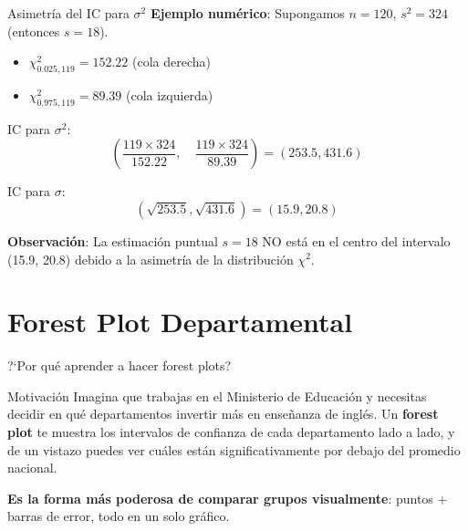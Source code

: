 \documentclass[aspectratio=169, 11pt]{beamer}
\begin{document}
\begin{frame}{Asimetría del IC para $\sigma^2$}
\textbf{Ejemplo numérico}: Supongamos $n = 120$, $s^2 = 324$ (entonces $s = 18$).

\vspace{0.3cm}
\begin{itemize}
  \item $\chi^2_{0.025, 119} = 152.22$ (cola derecha)
  \item $\chi^2_{0.975, 119} = 89.39$ (cola izquierda)
\end{itemize}

\vspace{0.3cm}
IC para $\sigma^2$:
\[
\left( \frac{119 \times 324}{152.22}, \quad \frac{119 \times 324}{89.39} \right) = (253.5, 431.6)
\]

\vspace{0.3cm}
IC para $\sigma$:
\[
(\sqrt{253.5}, \sqrt{431.6}) = (15.9, 20.8)
\]

\vspace{0.3cm}
\textbf{Observación}: La estimación puntual $s = 18$ NO está en el centro del intervalo (15.9, 20.8) debido a la asimetría de la distribución $\chi^2$.
\end{frame}

\section{Forest Plot Departamental}

\begin{frame}{?`Por qu\'e aprender a hacer forest plots?}
\begin{exampleblock}{Motivaci\'on}
Imagina que trabajas en el Ministerio de Educaci\'on y necesitas decidir en qu\'e departamentos invertir m\'as en ense\~nanza de ingl\'es. Un \textbf{forest plot} te muestra los intervalos de confianza de cada departamento lado a lado, y de un vistazo puedes ver cu\'ales est\'an significativamente por debajo del promedio nacional.
\end{exampleblock}

\textbf{Es la forma m\'as poderosa de comparar grupos visualmente}: puntos + barras de error, todo en un solo gr\'afico.
\end{frame}
\end{document}
